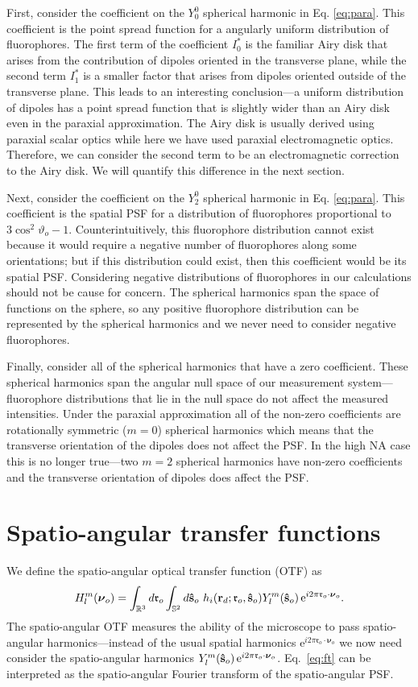 \documentclass[11pt]{article}
\newcommand{\me}{\mathrm{e}}
\providecommand{\ro}[1]{\mathbf{\mathfrak{r}}_o}
\providecommand{\so}[1]{\mathbf{\hat{s}}_o}
\providecommand{\rd}[1]{\mathbf{r}_d}
\providecommand{\bs}[1]{\boldsymbol{#1}}
\begin{document}
First, consider the coefficient on the $Y_0^0$ spherical harmonic in
Eq. \ref{eq:para}. This coefficient is the point spread function for a angularly
uniform distribution of fluorophores. The first term of the coefficient $I_0^*$
is the familiar Airy disk that arises from the contribution of dipoles oriented
in the transverse plane, while the second term $I_1^*$ is a smaller factor that
arises from dipoles oriented outside of the transverse plane. This leads to an
interesting conclusion---a uniform distribution of dipoles has a point spread
function that is slightly wider than an Airy disk even in the paraxial
approximation. The Airy disk is usually derived using paraxial scalar optics
while here we have used paraxial electromagnetic optics. Therefore, we can
consider the second term to be an electromagnetic correction to the Airy
disk. We will quantify this difference in the next section.

Next, consider the coefficient on the $Y_2^0$ spherical harmonic in
Eq. \ref{eq:para}. This coefficient is the spatial PSF for a distribution of
fluorophores proportional to $3\cos^2\vartheta_o - 1$. Counterintuitively, this
fluorophore distribution cannot exist because it would require a negative number
of fluorophores along some orientations; but if this distribution could exist,
then this coefficient would be its spatial PSF. Considering negative
distributions of fluorophores in our calculations should not be cause for
concern. The spherical harmonics span the space of functions on the sphere, so
any positive fluorophore distribution can be represented by the spherical
harmonics and we never need to consider negative fluorophores.
    
Finally, consider all of the spherical harmonics that have a zero
coefficient. These spherical harmonics span the angular null space of our
measurement system---fluorophore distributions that lie in the null space do not
affect the measured intensities. Under the paraxial approximation all of the
non-zero coefficients are rotationally symmetric ($m=0$) spherical harmonics
which means that the transverse orientation of the dipoles does not affect the
PSF. In the high NA case this is no longer true---two $m=2$ spherical harmonics
have non-zero coefficients and the transverse orientation of dipoles does affect
the PSF.


\section{Spatio-angular transfer functions}
We define the spatio-angular optical transfer function (OTF) as
\begin{align}
  H_l^m(\bs{\nu}_o) = \int_{\mathbb{R}^3}d\ro{} \int_{\mathbb{S}^2}d\so{}\ h_i(\rd{}; \ro{}, \so{}) Y_l^m(\so{})\thinspace\me^{i 2\pi \ro{}\cdot\bs{\nu}_o}. \label{eq:ft}
\end{align}
The spatio-angular OTF measures the ability of the microscope to pass
spatio-angular harmonics---instead of the usual spatial harmonics
$\me^{i 2\pi \ro{}\cdot\bs{\nu}_o}$ we now need consider the spatio-angular
harmonics $Y_l^m(\so{})\thinspace\me^{i 2\pi
  \ro{}\cdot\bs{\nu}_o}$. Eq.~\ref{eq:ft} can be interpreted as the
spatio-angular Fourier transform of the spatio-angular PSF.
\end{document}
